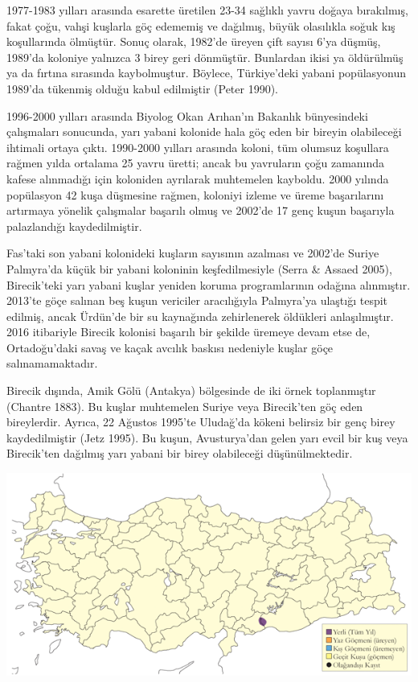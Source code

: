 \documentclass[
  letterpaper,
  DIV=11,
  numbers=noendperiod]{scrreprt}
\begin{document}
1977-1983 yılları arasında esarette üretilen 23-34 sağlıklı yavru doğaya
bırakılmış, fakat çoğu, vahşi kuşlarla göç edememiş ve dağılmış, büyük
olasılıkla soğuk kış koşullarında ölmüştür. Sonuç olarak, 1982'de üreyen
çift sayısı 6'ya düşmüş, 1989'da koloniye yalnızca 3 birey geri
dönmüştür. Bunlardan ikisi ya öldürülmüş ya da fırtına sırasında
kaybolmuştur. Böylece, Türkiye'deki yabani popülasyonun 1989'da tükenmiş
olduğu kabul edilmiştir (Peter 1990).

1996-2000 yılları arasında Biyolog Okan Arıhan'ın Bakanlık bünyesindeki
çalışmaları sonucunda, yarı yabani kolonide hala göç eden bir bireyin
olabileceği ihtimali ortaya çıktı. 1990-2000 yılları arasında koloni,
tüm olumsuz koşullara rağmen yılda ortalama 25 yavru üretti; ancak bu
yavruların çoğu zamanında kafese alınmadığı için koloniden ayrılarak
muhtemelen kayboldu. 2000 yılında popülasyon 42 kuşa düşmesine rağmen,
koloniyi izleme ve üreme başarılarını artırmaya yönelik çalışmalar
başarılı olmuş ve 2002'de 17 genç kuşun başarıyla palazlandığı
kaydedilmiştir.

Fas'taki son yabani kolonideki kuşların sayısının azalması ve 2002'de
Suriye Palmyra'da küçük bir yabani koloninin keşfedilmesiyle (Serra \&
Assaed 2005), Birecik'teki yarı yabani kuşlar yeniden koruma
programlarının odağına alınmıştır. 2013'te göçe salınan beş kuşun
vericiler aracılığıyla Palmyra'ya ulaştığı tespit edilmiş, ancak
Ürdün'de bir su kaynağında zehirlenerek öldükleri anlaşılmıştır. 2016
itibariyle Birecik kolonisi başarılı bir şekilde üremeye devam etse de,
Ortadoğu'daki savaş ve kaçak avcılık baskısı nedeniyle kuşlar göçe
salınamamaktadır.

Birecik dışında, Amik Gölü (Antakya) bölgesinde de iki örnek
toplanmıştır (Chantre 1883). Bu kuşlar muhtemelen Suriye veya
Birecik'ten göç eden bireylerdir. Ayrıca, 22 Ağustos 1995'te Uludağ'da
kökeni belirsiz bir genç birey kaydedilmiştir (Jetz 1995). Bu kuşun,
Avusturya'dan gelen yarı evcil bir kuş veya Birecik'ten dağılmış yarı
yabani bir birey olabileceği düşünülmektedir.

\includegraphics{images/harita_Page_061.png}
\end{document}
